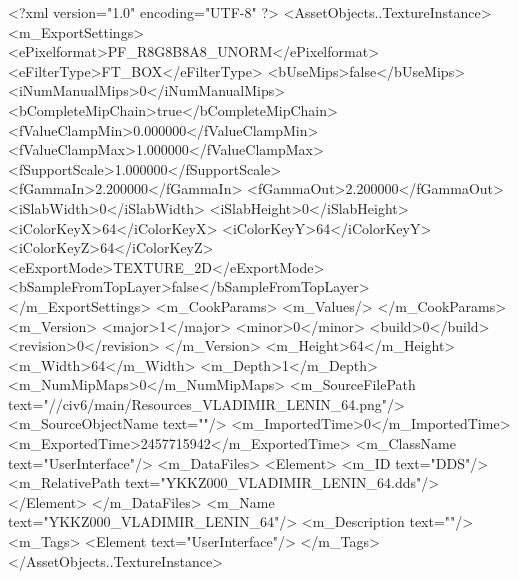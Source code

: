 <?xml version="1.0" encoding="UTF-8" ?>
<AssetObjects..TextureInstance>
	<m_ExportSettings>
		<ePixelformat>PF_R8G8B8A8_UNORM</ePixelformat>
		<eFilterType>FT_BOX</eFilterType>
		<bUseMips>false</bUseMips>
		<iNumManualMips>0</iNumManualMips>
		<bCompleteMipChain>true</bCompleteMipChain>
		<fValueClampMin>0.000000</fValueClampMin>
		<fValueClampMax>1.000000</fValueClampMax>
		<fSupportScale>1.000000</fSupportScale>
		<fGammaIn>2.200000</fGammaIn>
		<fGammaOut>2.200000</fGammaOut>
		<iSlabWidth>0</iSlabWidth>
		<iSlabHeight>0</iSlabHeight>
		<iColorKeyX>64</iColorKeyX>
		<iColorKeyY>64</iColorKeyY>
		<iColorKeyZ>64</iColorKeyZ>
		<eExportMode>TEXTURE_2D</eExportMode>
		<bSampleFromTopLayer>false</bSampleFromTopLayer>
	</m_ExportSettings>
	<m_CookParams>
		<m_Values/>
	</m_CookParams>
	<m_Version>
		<major>1</major>
		<minor>0</minor>
		<build>0</build>
		<revision>0</revision>
	</m_Version>
	<m_Height>64</m_Height>
	<m_Width>64</m_Width>
	<m_Depth>1</m_Depth>
	<m_NumMipMaps>0</m_NumMipMaps>
	<m_SourceFilePath text="//civ6/main/Resources_VLADIMIR_LENIN_64.png"/>
	<m_SourceObjectName text=""/>
	<m_ImportedTime>0</m_ImportedTime>
	<m_ExportedTime>2457715942</m_ExportedTime>
	<m_ClassName text="UserInterface"/>
	<m_DataFiles>
		<Element>
			<m_ID text="DDS"/>
			<m_RelativePath text="YKKZ000_VLADIMIR_LENIN_64.dds"/>
		</Element>
	</m_DataFiles>
	<m_Name text="YKKZ000_VLADIMIR_LENIN_64"/>
	<m_Description text=""/>
	<m_Tags>
		<Element text="UserInterface"/>
	</m_Tags>
</AssetObjects..TextureInstance>


